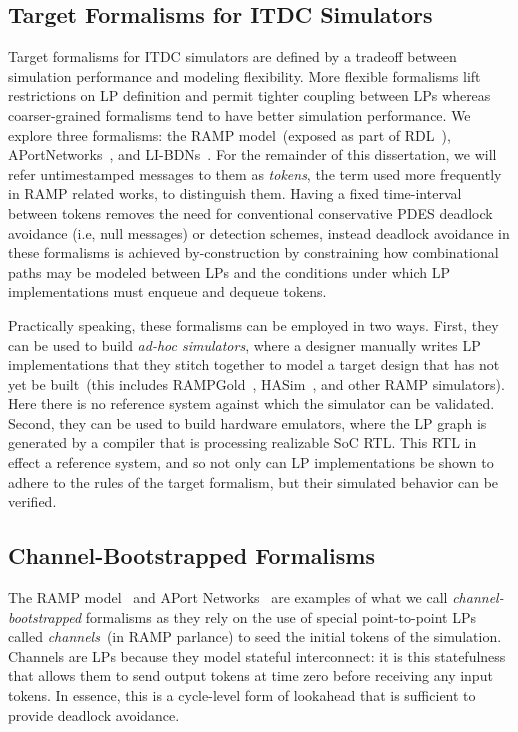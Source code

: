 \subsection{Target Formalisms for ITDC Simulators}

Target formalisms for ITDC simulators are defined by a tradeoff between
simulation performance and modeling flexibility. More flexible formalisms lift
restrictions on LP definition and permit tighter coupling between LPs whereas
coarser-grained formalisms tend to have better simulation performance. We
explore three formalisms: the RAMP model~(exposed as part of RDL~\cite{RDL}),
APortNetworks~\cite{APortNetworks}, and LI-BDNs~\cite{LIBDN}. For the
remainder of this dissertation, we will refer untimestamped messages to them as
\emph{tokens}, the term used more frequently in RAMP related works, to
distinguish them.  Having a fixed time-interval between tokens removes the need
for conventional conservative PDES deadlock avoidance (i.e, null messages) or
detection schemes, instead deadlock avoidance in these formalisms is achieved
by-construction by constraining how combinational paths may be modeled between
LPs and the conditions under which LP implementations must enqueue and dequeue
tokens.

Practically speaking, these formalisms can be employed in two ways. First,
they can be used to build \emph{ad-hoc simulators}, where a designer manually writes
LP implementations that they stitch together to model a target design that has
not yet be built~(this includes RAMPGold~\cite{RAMPGold}, HASim~\cite{HASim},
and other RAMP simulators). Here there is no reference system against
which the simulator can be validated. Second, they can be used to build
hardware emulators, where the LP graph is generated by a compiler that is
processing realizable SoC RTL. This RTL in effect a reference system, and so
not only can LP implementations be shown to adhere to the rules of the target
formalism, but their simulated behavior can be verified.

\subsection{Channel-Bootstrapped Formalisms}

The RAMP model~\cite{RDL} and APort Networks~\cite{APortNetworks} are examples
of what we call \emph{channel-bootstrapped} formalisms as they rely on the use
of special point-to-point LPs called \emph{channels}~(in RAMP parlance) to
seed the initial tokens of the simulation. Channels are LPs because they
model stateful interconnect: it is this statefulness that allows them to send
output tokens at time zero before receiving any input tokens. In essence, this is
a cycle-level form of lookahead that is sufficient to provide deadlock avoidance.

